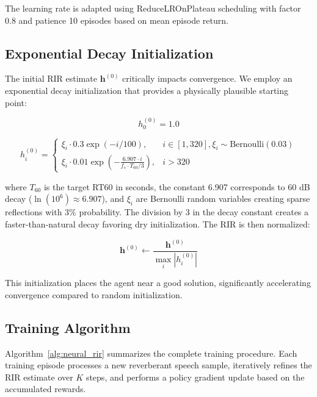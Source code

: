 The learning rate is adapted using ReduceLROnPlateau scheduling with factor 0.8 and patience 10 episodes based on mean episode return.

\subsection{Exponential Decay Initialization}
\label{subsec:initialization}

The initial RIR estimate $\mathbf{h}^{(0)}$ critically impacts convergence. We employ an exponential decay initialization that provides a physically plausible starting point:

\begin{equation}
h_0^{(0)} = 1.0
\label{eq:init_direct}
\end{equation}

\begin{equation}
h_i^{(0)} = \begin{cases}
\xi_i \cdot 0.3 \exp(-i/100), & i \in [1, 320], \xi_i \sim \text{Bernoulli}(0.03) \\
\xi_i \cdot 0.01 \exp\left(-\frac{6.907 \cdot i}{f_s \cdot T_{60}/3}\right), & i > 320
\end{cases}
\label{eq:init_reflections}
\end{equation}

\noindent where $T_{60}$ is the target RT60 in seconds, the constant 6.907 corresponds to 60 dB decay ($\ln(10^6) \approx 6.907$), and $\xi_i$ are Bernoulli random variables creating sparse reflections with 3\% probability. The division by 3 in the decay constant creates a faster-than-natural decay favoring dry initialization. The RIR is then normalized:

\begin{equation}
\mathbf{h}^{(0)} \leftarrow \frac{\mathbf{h}^{(0)}}{\max_i |h_i^{(0)}|}
\label{eq:init_normalize}
\end{equation}

This initialization places the agent near a good solution, significantly accelerating convergence compared to random initialization.

\subsection{Training Algorithm}
\label{subsec:training_algorithm}

Algorithm~\ref{alg:neural_rir} summarizes the complete training procedure. Each training episode processes a new reverberant speech sample, iteratively refines the RIR estimate over $K$ steps, and performs a policy gradient update based on the accumulated rewards.

